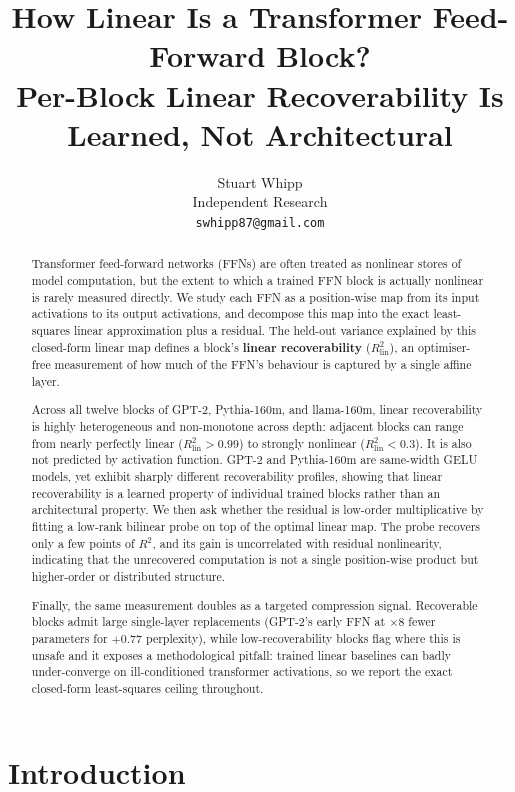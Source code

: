 \documentclass{article}
\title{How Linear Is a Transformer Feed-Forward Block?\\
Per-Block Linear Recoverability Is Learned, Not Architectural}
\author{%
  Stuart Whipp\\
  Independent Research\\
  \texttt{swhipp87@gmail.com}
}
\newcommand{\Rlin}{R^2_{\mathrm{lin}}}
\begin{document}
\maketitle

\begin{abstract}
Transformer feed-forward networks (FFNs) are often treated as nonlinear stores of model
computation, but the extent to which a trained FFN block is actually nonlinear is rarely
measured directly. We study each FFN as a position-wise map from its input activations to
its output activations, and decompose this map into the exact least-squares linear
approximation plus a residual. The held-out variance explained by this closed-form linear
map defines a block's \textbf{linear recoverability} ($\Rlin$), an optimiser-free
measurement of how much of the FFN's behaviour is captured by a single affine layer.

Across all twelve blocks of GPT-2, Pythia-160m, and llama-160m, linear recoverability is
highly heterogeneous and non-monotone across depth: adjacent blocks can range from nearly
perfectly linear ($\Rlin>0.99$) to strongly nonlinear ($\Rlin<0.3$). It is also not
predicted by activation function. GPT-2 and Pythia-160m are same-width GELU models, yet
exhibit sharply different recoverability profiles, showing that linear recoverability is a
learned property of individual trained blocks rather than an architectural property. We
then ask whether the residual is low-order multiplicative by fitting a low-rank bilinear
probe on top of the optimal linear map. The probe recovers only a few points of $R^2$, and
its gain is uncorrelated with residual nonlinearity, indicating that the unrecovered
computation is not a single position-wise product but higher-order or distributed structure.

Finally, the same measurement doubles as a targeted compression signal. Recoverable
blocks admit large single-layer replacements (GPT-2's early FFN at $\times 8$ fewer
parameters for $+0.77$ perplexity), while low-recoverability blocks flag where this is
unsafe and it exposes a methodological pitfall: trained linear baselines can badly
under-converge on ill-conditioned transformer activations, so we report the exact
closed-form least-squares ceiling throughout.
\end{abstract}

\section{Introduction}
\label{sec:intro}
\end{document}
